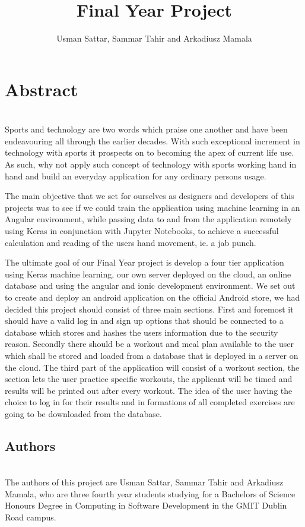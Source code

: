 \documentclass[a4paper,12pt,twoside]{report}
\begin{document}
\title{Final Year Project}
\author{Usman Sattar, Sammar Tahir and
Arkadiusz Mamala}

\maketitle
\preface
\section*{Abstract}
\\
Sports and technology are two words which praise one another and have been endeavouring all through the earlier decades. With such exceptional increment in technology with sports it prospects on to becoming the apex of current life use. As such, why not apply such concept of technology with sports working hand in hand and build an everyday application for any ordinary persons usage.

The main objective that we set for ourselves as designers and developers of this projects was to see if we could train the application using machine learning in an Angular environment, while passing 
data to and from the application remotely using Keras in conjunction with Jupyter Notebooks, to achieve a successful calculation and reading of the users hand movement, ie. a jab punch.

The ultimate goal of our Final Year project is develop a four tier application using Keras machine learning, our own server deployed on the cloud, an online database and using the angular and ionic development environment.
We set out to create and deploy an android application on the official Android store, we had decided this project should consist of three main sections. 
First and foremost it should have a valid log in and sign up options that should be connected to a database which stores and hashes the users information due to the security reason. 
Secondly there should be a workout and meal plan available to the user which shall be stored and loaded from a database that is deployed in a server on the cloud.
The third part of the application will consist of a workout section, the section lets the user practice specific workouts, the applicant will be timed and results will be printed out after every workout. 
The idea of the user having the choice to log in for their results and in formations of all completed exercises are going to be downloaded from the database.

\subsection*{Authors}
\\
The authors of this project are Usman Sattar, Sammar Tahir and
Arkadiusz Mamala, who are three fourth year students studying for a
Bachelors of Science Honours Degree in Computing in Software
Development in the GMIT Dublin Road campus.
    
\end{document}
